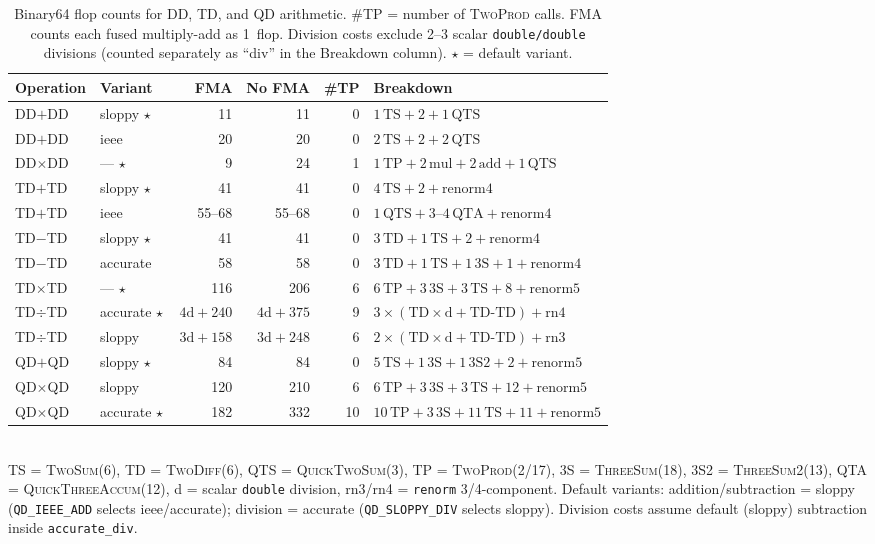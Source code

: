 \documentclass[11pt,a4paper]{article}
\begin{document}
\begin{table}[ht]
\centering
\caption{Binary64 flop counts for DD, TD, and QD arithmetic.
  \#TP = number of \textsc{TwoProd} calls.
  FMA counts each fused multiply-add as 1~flop.
  Division costs exclude 2--3 scalar \texttt{double/double}
  divisions (counted separately as ``div'' in the Breakdown column).
  $\star$ = default variant.}
\label{tab:flop-main}
\begin{tabular}{llrrrl}
\toprule
Operation & Variant & FMA & No FMA & \#TP & Breakdown \\
\midrule
DD$+$DD & sloppy$\,\star$ & 11 & 11 & 0
  & $1\,\text{TS}+2+1\,\text{QTS}$ \\
DD$+$DD & ieee & 20 & 20 & 0
  & $2\,\text{TS}+2+2\,\text{QTS}$ \\
DD$\times$DD & ---$\,\star$ & 9 & 24 & 1
  & $1\,\text{TP}+2\,\text{mul}+2\,\text{add}+1\,\text{QTS}$ \\
\midrule
TD$+$TD & sloppy$\,\star$ & 41 & 41 & 0
  & $4\,\text{TS}+2+\text{renorm4}$ \\
TD$+$TD & ieee & 55--68 & 55--68 & 0
  & $1\,\text{QTS}+3\text{--}4\,\text{QTA}+\text{renorm4}$ \\
TD$-$TD & sloppy$\,\star$ & 41 & 41 & 0
  & $3\,\text{TD}+1\,\text{TS}+2+\text{renorm4}$ \\
TD$-$TD & accurate & 58 & 58 & 0
  & $3\,\text{TD}+1\,\text{TS}+1\,\text{3S}+1+\text{renorm4}$ \\
TD$\times$TD & ---$\,\star$ & 116 & 206 & 6
  & $6\,\text{TP}+3\,\text{3S}+3\,\text{TS}+8+\text{renorm5}$ \\
TD$\div$TD & accurate$\,\star$ & $4\text{d}+240$ & $4\text{d}+375$ & 9
  & $3\times(\text{TD}{\times}\text{d}+\text{TD}{\text{-}}\text{TD})+\text{rn4}$ \\
TD$\div$TD & sloppy & $3\text{d}+158$ & $3\text{d}+248$ & 6
  & $2\times(\text{TD}{\times}\text{d}+\text{TD}{\text{-}}\text{TD})+\text{rn3}$ \\
\midrule
QD$+$QD & sloppy$\,\star$ & 84 & 84 & 0
  & $5\,\text{TS}+1\,\text{3S}+1\,\text{3S2}+2+\text{renorm5}$ \\
QD$\times$QD & sloppy & 120 & 210 & 6
  & $6\,\text{TP}+3\,\text{3S}+3\,\text{TS}+12+\text{renorm5}$ \\
QD$\times$QD & accurate$\,\star$ & 182 & 332 & 10
  & $10\,\text{TP}+3\,\text{3S}+11\,\text{TS}+11+\text{renorm5}$ \\
\bottomrule
\end{tabular}
\\[2pt]
\footnotesize
TS = \textsc{TwoSum}(6), TD = \textsc{TwoDiff}(6),
QTS = \textsc{QuickTwoSum}(3), TP = \textsc{TwoProd}(2/17),
3S = \textsc{ThreeSum}(18), 3S2 = \textsc{ThreeSum2}(13),
QTA = \textsc{QuickThreeAccum}(12),
d = scalar \texttt{double} division,
rn3/rn4 = \texttt{renorm} 3/4-component.
Default variants: addition/subtraction = sloppy
(\texttt{QD\_IEEE\_ADD} selects ieee/accurate);
division = accurate
(\texttt{QD\_SLOPPY\_DIV} selects sloppy).
Division costs assume default (sloppy) subtraction inside
\texttt{accurate\_div}.
\end{table}
\end{document}
